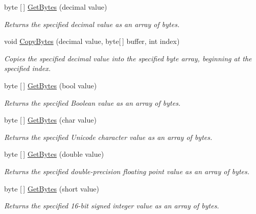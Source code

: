 \begin{DoxyCompactItemize}
byte \mbox{[}$\,$\mbox{]} \mbox{\hyperlink{class_t_net_1_1_i_o_1_1_endian_bit_converter_a2c5a4d5038b4af6f8712bff82302faa8}{Get\+Bytes}} (decimal value)
\begin{DoxyCompactList}\small\item\em Returns the specified decimal value as an array of bytes. \end{DoxyCompactList}\item 
void \mbox{\hyperlink{class_t_net_1_1_i_o_1_1_endian_bit_converter_ae6c54f83688fed430b88c2d769f7d693}{Copy\+Bytes}} (decimal value, byte\mbox{[}$\,$\mbox{]} buffer, int index)
\begin{DoxyCompactList}\small\item\em Copies the specified decimal value into the specified byte array, beginning at the specified index. \end{DoxyCompactList}\item 
byte \mbox{[}$\,$\mbox{]} \mbox{\hyperlink{class_t_net_1_1_i_o_1_1_endian_bit_converter_aa7c0bec707cb4e3b6866c96bb53276c4}{Get\+Bytes}} (bool value)
\begin{DoxyCompactList}\small\item\em Returns the specified Boolean value as an array of bytes. \end{DoxyCompactList}\item 
byte \mbox{[}$\,$\mbox{]} \mbox{\hyperlink{class_t_net_1_1_i_o_1_1_endian_bit_converter_ac0bf5270842f7892896cfb842d4eee6a}{Get\+Bytes}} (char value)
\begin{DoxyCompactList}\small\item\em Returns the specified Unicode character value as an array of bytes. \end{DoxyCompactList}\item 
byte \mbox{[}$\,$\mbox{]} \mbox{\hyperlink{class_t_net_1_1_i_o_1_1_endian_bit_converter_a10b7358f3ab627c0376f5236c0165a3f}{Get\+Bytes}} (double value)
\begin{DoxyCompactList}\small\item\em Returns the specified double-\/precision floating point value as an array of bytes. \end{DoxyCompactList}\item 
byte \mbox{[}$\,$\mbox{]} \mbox{\hyperlink{class_t_net_1_1_i_o_1_1_endian_bit_converter_ab0553ed30b167a3cd3df5a1422c31b98}{Get\+Bytes}} (short value)
\begin{DoxyCompactList}\small\item\em Returns the specified 16-\/bit signed integer value as an array of bytes. \end{DoxyCompactList}\item 

\end{DoxyCompactItemize}
